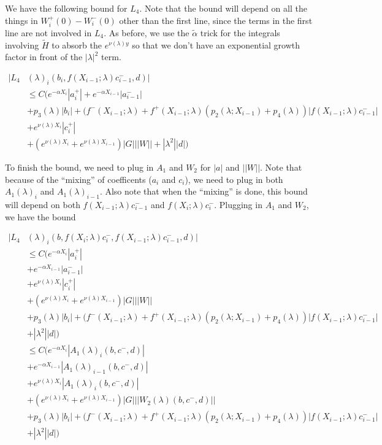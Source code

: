 \documentclass[12pt]{article}
\begin{document}
\begin{enumerate}
We have the following bound for $L_4$. Note that the bound will depend on all the things in $W_i^+(0) - W_i^-(0)$ other than the first line, since the terms in the first line are not involved in $L_4$. As before, we use the $\tilde{\alpha}$ trick for the integrals involving $\tilde{H}$ to absorb the $e^{\nu(\lambda)y}$ so that we don't have an exponential growth factor in front of the $|\lambda|^2$ term.

\begin{align*}
|L_4&(\lambda)_i(b_i, f(X_{i-1}; \lambda) c_{i-1}^-, d)|\\ 
&\leq C \Big( e^{-\alpha X_i} |a_i^+| +  e^{-\alpha X_{i-1}} |a_{i-1}^-| \\
&+ p_3(\lambda) |b_i| + (f^-(X_{i-1}; \lambda) + f^+(X_{i-1}; \lambda) (p_2(\lambda; X_{i-1}) + p_4(\lambda)) | f(X_{i-1}; \lambda) c_{i-1}^-| \\
&+ e^{\nu(\lambda)X_{i}} |c_i^+| \\
&+ (e^{\nu(\lambda)X_i} + e^{\nu(\lambda)X_{i-1}}) |G| ||W|| + |\lambda^2| |d| \Big)
\end{align*}

To finish the bound, we need to plug in $A_1$ and $W_2$ for $|a|$ and $||W||$. Note that because of the ``mixing'' of coefficents ($a_i$ and $c_i$), we need to plug in both $A_1(\lambda)_i$ and $A_1(\lambda)_{i-1}$. Also note that when the ``mixing'' is done, this bound will depend on both $f(X_{i-1}; \lambda) c_{i-1}^-$ and $f(X_i; \lambda) c_i^-$. Plugging in $A_1$ and $W_2$, we have the bound

\begin{align*}
|L_4&(\lambda)_i(b, f(X_i; \lambda) c_i^-, f(X_{i-1}; \lambda) c_{i-1}^-, d)|\\ 
&\leq C\Big( e^{-\alpha X_i} |a_i^+| \\
&+  e^{-\alpha X_{i-1}} |a_{i-1}^-| \\
&+ e^{\nu(\lambda)X_{i}} |c_i^+| \\
&+ (e^{\nu(\lambda)X_i} + e^{\nu(\lambda)X_{i-1}}) |G| ||W|| \\
&+ p_3(\lambda) |b_i| + (f^-(X_{i-1}; \lambda) + f^+(X_{i-1}; \lambda) (p_2(\lambda; X_{i-1}) + p_4(\lambda)) | f(X_{i-1}; \lambda) c_{i-1}^-| \\
&+|\lambda^2| |d| \Big) \\
&\leq C\Big( e^{-\alpha X_i} |A_1(\lambda)_i(b, c^-, d)| \\
&+  e^{-\alpha X_{i-1}} |A_1(\lambda)_{i-1}(b, c^-, d)| \\
&+ e^{\nu(\lambda)X_{i}} |A_1(\lambda)_i(b, c^-, d)|  \\
&+ (e^{\nu(\lambda)X_i} + e^{\nu(\lambda)X_{i-1}}) |G| ||W_2(\lambda)(b,c^-,d)|| \\
&+ p_3(\lambda) |b_i| + (f^-(X_{i-1}; \lambda) + f^+(X_{i-1}; \lambda) (p_2(\lambda; X_{i-1}) + p_4(\lambda)) | f(X_{i-1}; \lambda) c_{i-1}^-| \\
&+|\lambda^2| |d| \Big)
\end{align*}


\end{enumerate}
\end{document}

